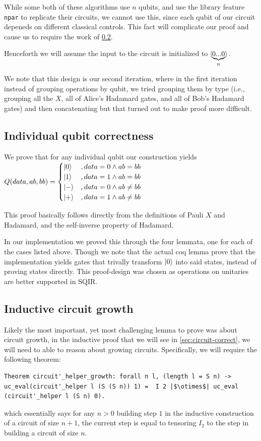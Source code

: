 \documentclass{article}
\begin{document}
While some both of these algorithms use $n$ qubits, and use the library feature \texttt{npar} to replicate their circuits, we cannot use this, since each qubit of our circuit depeneds on different classical controls. This fact will complicate our proof and cause us to require the work of \cref{sec:circuit-growth}.

Henceforth we will assume the input to the circuit is initialized to $\ket{\underbrace{0...0}_n}$.

We note that this design is our second iteration, where in the first iteration instead of grouping operations by qubit, we tried grouping them by type (i.e., grouping all the $X$, all of Alice's Hadamard gates, and all of Bob's Hadamard gates) and then concatenating but that turned out to make proof more difficult.

\subsection{Individual qubit correctness}\label{sec:qubit-correct}
We prove that for any individual qubit our construction yields 
$Q(data,ab,bb) = \begin{cases} 
\ket{0}&, data=0 \wedge ab=bb\\
\ket{1}&, data=1 \wedge ab=bb\\
\ket{-}&, data=0 \wedge ab \neq bb\\
\ket{+}&, data=1 \wedge ab \neq bb
\end{cases}
$

This proof basically follows directly from the definitions of Pauli $X$ and Hadamard, and the self-inverse property of Hadamard.

In our implementation we proved this through the four lemmata, one for each of the cases listed above.
Though we note that the actual coq lemma prove that the implementation yields gates that trivally transform $\ket{0}$ into said states, instead of proving states directly. 
This proof-design was chosen as operations on unitaries are better supported in SQIR.

\subsection{Inductive circuit growth}\label{sec:circuit-growth}

Likely the most important, yet most challenging lemma to prove was about circuit growth, in the inductive proof that we will see in \cref{sec:circuit-correct}, we will need to able to reason about growing circuits.
Specifically, we will require the following theorem:
\begin{verbatim}
Theorem circuit'_helper_growth: forall n l, (length l = S n) ->  uc_eval(circuit'_helper l (S (S n)) 1) =  I 2 |$\otimes$| uc_eval (circuit'_helper l (S n) 0).
\end{verbatim}
which essentially says for any $n>0$ building step $1$ in the inductive construction of a circuit of size $n+1$, the current step is equal to tensoring $I_2$ to the  step in building a circuit of size $n$.
\end{document}
